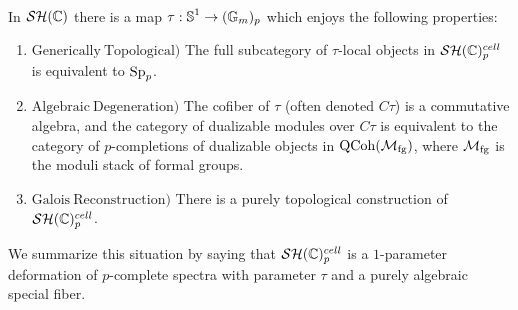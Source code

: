 \begin{thm}\label{thm:C-main}\

  In $\mathcal{SH}(\mathbb{C})$
  there is a map $\tau : \operatorname{\mathbb{S}}^1 \to (\mathbb{G}_m)_p$
  which enjoys the following properties:
  \begin{enumerate}
  \item[(1.\hspace{1em}]\hspace{-1.1em}$\mathrm{Generically\ Topological})$ The full subcategory of $\tau$-local objects in $\mathcal{SH}(\mathbb{C})^{cell}_p$ is equivalent to $\operatorname{\mathrm{Sp}}_p$.
  \item[(2.\hspace{1em}]\hspace{-1.1em}$\mathrm{Algebraic\ Degeneration})$ The cofiber of $\tau$ (often denoted $C\tau$) is a commutative algebra, and the category of dualizable modules over $C\tau$ is equivalent to the category of $p$-completions of dualizable objects in $\mathrm{QCoh}(\mathcal{M}_{\mathrm{fg}})$, where $\mathcal{M}_{\mathrm{fg}}$ is the moduli stack of formal groups.
  \item[(3.\hspace{1em}]\hspace{-1.1em}$\mathrm{Galois\ Reconstruction})$ There is a purely topological construction of $\mathcal{SH}(\mathbb{C})_p^{cell}$.
  \end{enumerate}
  
  We summarize this situation by saying that $\mathcal{SH}(\mathbb{C})_p^{cell}$ is a $1$-parameter deformation of $p$-complete spectra with parameter $\tau$ and a purely algebraic special fiber.
\end{thm}

